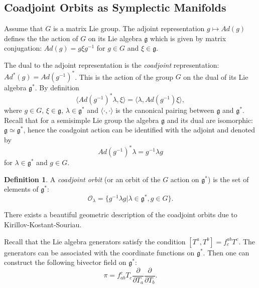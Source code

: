 \documentclass[11pt]{report}
\theoremstyle{plain}
\theoremstyle{definition}
\newtheorem{defn}[thm]{Definition}
\theoremstyle{remark}
\theoremstyle{remark}
\numberwithin{equation}{section}
\begin{document}
 

 
 
 \subsection{Coadjoint Orbits as Symplectic Manifolds}
 
 Assume that $G$ is a matrix Lie group. The adjoint representation $g\mapsto Ad(g)$ defines the the action of $G$ on its Lie algebra $\mathfrak{g}$ which is given by matrix conjugation: $Ad(g) = g\xi g^{-1}$ for $g\in G$ and $\xi \in \mathfrak{g}$.
 
 The dual to the adjoint representation is the \textit{coadjoint} representation: $Ad^*(g) = Ad(g^{-1})^*$. This is the action of the group $G$ on the dual of its Lie algebra $\mathfrak{g}^*$. By definition
 \begin{equation}
 \langle Ad(g^{-1})^* \lambda, \xi \rangle = \langle \lambda, Ad(g^{-1})\xi \rangle,
 \end{equation} 
 where $g\in G$, $\xi \in \mathfrak{g}$, $\lambda \in \mathfrak{g}^*$ and $\langle \cdot , \cdot \rangle$ is the canonical pairing between $\mathfrak{g}$ and $\mathfrak{g}^*$. 
 Recall that for a semisimple Lie group the algebra $\mathfrak{g}$ and its dual are isomorphic: $\mathfrak{g} \simeq \mathfrak{g}^*$, hence the coadgoint action can be identified with the adjoint and denoted by 
 \begin{equation}
 Ad(g^{-1})^* \lambda = g^{-1}\lambda g
 \end{equation}
  for $\lambda \in \mathfrak{g}^*$ and $g \in G$. 
 
 \begin{defn}
 A \textit{coadjoint orbit} (or an orbit of the $G$ action on $\mathfrak{g}^*$) is the set of elements of $\mathfrak{g}^*$:
 \begin{equation}
 \mathcal{O}_\lambda = \{g^{-1}\lambda g| \lambda \in \mathfrak{g}^*, g \in G\}.
 \end{equation}
 \end{defn}
 
 There exists a beautiful geometric description of the coadjoint orbits due to Kirillov-Kostant-Souriau. 
 
 Recall that the Lie algebra generators satisfy the condition $[T^a, T^b] = f^{ab}_c T^c$. The generators can be associated with the coordinate functions on $\mathfrak{g}^*$. Then one can construct the following bivector field on $\mathfrak{g}^*$:
 \begin{equation}\label{Poisson}
 \pi = f_{ab}^cT_c\frac{\partial}{\partial T_a}\frac{\partial}{\partial T_b}.
 \end{equation}
 
\end{document}

